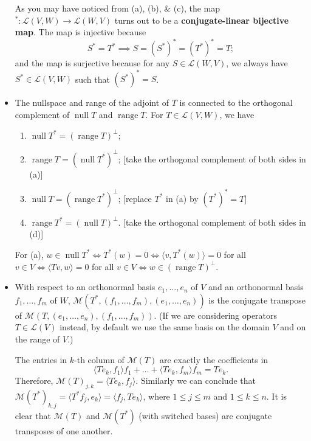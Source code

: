 \documentclass[11pt]{article}
\newcommand{\n}{\operatorname{null}}
\renewcommand{\r}{\operatorname{range}}
\newcommand{\inp}[2]{\langle #1, #2 \rangle}
\newcommand{\LV}{\mathcal{L}(V)}
\newcommand{\LVW}{\mathcal{L}(V,W)}
\newcommand{\M}{\mathcal{M}}
\begin{document}
\begin{itemize}
    As you may have noticed from (a), (b), \& (c), the map $^*: \LVW \to \mathcal{L}(W,V)$ turns out to be a \textbf{conjugate-linear bijective map}. The map is injective because $$S^*=T^* \implies S=(S^*)^*=(T^*)^*=T;$$ and the map is surjective because for any $S \in \mathcal{L}(W,V)$, we always have $S^* \in \LVW$ such that $(S^*)^*=S$.
    \item The nullspace and range of the adjoint of $T$ is connected to the orthogonal complement of $\n T$ and $\r T$. For $T \in \LVW$, we have
    \begin{enumerate}[label=(\alph*)]
        \item $\n T^* = (\r T)^\perp$;
        \item $\r T = (\n T^*)^\perp$; [take the orthogonal complement of both sides in (a)]
        \item $\n T = (\r T^*)^\perp$; [replace $T^*$ in (a) by $(T^*)^* = T$]
        \item $\r T^* = (\n T)^\perp$. [take the orthogonal complement of both sides in (d)]
    \end{enumerate}
    For (a), $w \in \n T^* \iff T^*(w) = 0 \iff \inp{v}{T^*(w)} = 0$ for all $v \in V \iff \inp{Tv}{w} = 0$ for all $v \in V \iff w \in (\r T)^\perp$.
    \item With respect to an orthonormal basis $e_1,\dots,e_n$ of $V$ and an orthonormal basis $f_1,\dots,f_m$ of $W$, $\M(T^*,(f_1,\dots,f_m),(e_1,\dots,e_n))$ is the conjugate transpose of $\M(T,(e_1,\dots,e_n),(f_1,\dots,f_m))$. (If we are considering operators $T \in \LV$ instead, by default we use the same basis on the domain $V$ and on the range of $V$.)
    
    The entries in $k$-th column of $\M(T)$ are exactly the coefficients in
    $$\inp{Te_k}{f_1}f_1+\dots+\inp{Te_k}{f_m}f_m = Te_k.$$ Therefore, $\M(T)_{j,k} = \inp{Te_k}{f_j}$. Similarly we can conclude that $\M(T^*)_{k,j} = \inp{T^*f_j}{e_k} = \inp{f_j}{Te_k}$, where $1 \leq j \leq m$ and $1 \leq k \leq n$. It is clear that $\M(T)$ and $\M(T^*)$ (with switched bases) are conjugate transposes of one another.


\end{itemize}
\end{document}
